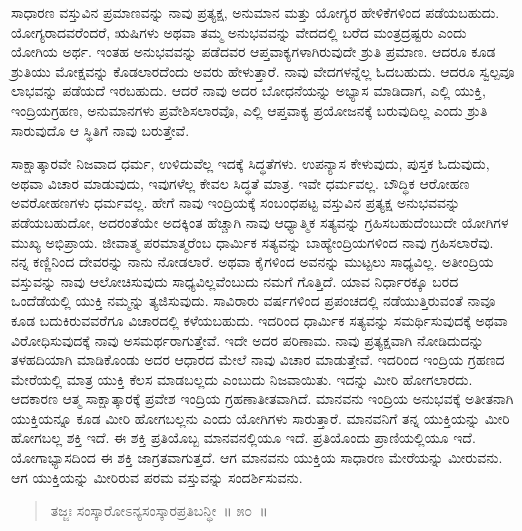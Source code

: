 
\vspace{0.1cm}

ಸಾಧಾರಣ ವಸ್ತುವಿನ ಪ್ರಮಾಣವನ್ನು ನಾವು ಪ್ರತ್ಯಕ್ಷ, ಅನುಮಾನ ಮತ್ತು ಯೋಗ್ಯರ ಹೇಳಿಕೆಗಳಿಂದ ಪಡೆಯಬಹುದು. ಯೋಗ್ಯರಾದವರೆಂದರೆ, ಋಷಿಗಳು ಅಥವಾ ತಮ್ಮ ಅನುಭವವನ್ನು ವೇದದಲ್ಲಿ ಬರೆದ ಮಂತ್ರದ್ರಷ್ಟರು ಎಂದು ಯೋಗಿಯ ಅರ್ಥ. ಇಂತಹ ಅನುಭವವನ್ನು ಪಡೆದವರ ಆಪ್ತವಾಕ್ಯಗಳಾಗಿರುವುದೇ ಶ್ರುತಿ ಪ್ರಮಾಣ. ಆದರೂ ಕೂಡ ಶ್ರುತಿಯು ಮೋಕ್ಷವನ್ನು ಕೊಡಲಾರದೆಂದು ಅವರು ಹೇಳುತ್ತಾರೆ. ನಾವು ವೇದಗಳನ್ನೆಲ್ಲ ಓದಬಹುದು. ಆದರೂ ಸ್ವಲ್ಪವೂ ಲಾಭವನ್ನು ಪಡೆಯದೆ ಇರಬಹುದು. ಆದರೆ ನಾವು ಅದರ ಬೋಧನೆಯನ್ನು ಅಭ್ಯಾಸ ಮಾಡಿದಾಗ, ಎಲ್ಲಿ ಯುಕ್ತಿ, ಇಂದ್ರಿಯಗ್ರಹಣ, ಅನುಮಾನಗಳು ಪ್ರವೇಶಿಸಲಾರವೊ, ಎಲ್ಲಿ ಆಪ್ತವಾಕ್ಯ ಪ್ರಯೋಜನಕ್ಕೆ ಬರುವುದಿಲ್ಲ ಎಂದು ಶ್ರುತಿ ಸಾರುವುದೊ ಆ ಸ್ಥಿತಿಗೆ ನಾವು ಬರುತ್ತೇವೆ. 

ಸಾಕ್ಷಾತ್ಕಾರವೇ ನಿಜವಾದ ಧರ್ಮ, ಉಳಿದುವೆಲ್ಲ ಇದಕ್ಕೆ ಸಿದ್ಧತೆಗಳು. ಉಪನ್ಯಾಸ ಕೇಳುವುದು, ಪುಸ್ತಕ ಓದುವುದು, ಅಥವಾ ವಿಚಾರ ಮಾಡುವುದು, ಇವುಗಳೆಲ್ಲ ಕೇವಲ ಸಿದ್ಧತೆ ಮಾತ್ರ. ಇವೇ ಧರ್ಮವಲ್ಲ. ಬೌದ್ಧಿಕ ಆರೋಹಣ ಅವರೋಹಣಗಳು ಧರ್ಮವಲ್ಲ. ಹೇಗೆ ನಾವು ಇಂದ್ರಿಯಕ್ಕೆ ಸಂಬಂಧಪಟ್ಟ ವಸ್ತುವಿನ ಪ್ರತ್ಯಕ್ಷ ಅನುಭವವನ್ನು ಪಡೆಯಬಹುದೋ, ಅದರಂತೆಯೇ ಅದಕ್ಕಿಂತ ಹೆಚ್ಚಾಗಿ ನಾವು ಆಧ್ಯಾತ್ಮಿಕ ಸತ್ಯವನ್ನು ಗ್ರಹಿಸಬಹುದೆಂಬುದೇ ಯೋಗಿಗಳ ಮುಖ್ಯ ಅಭಿಪ್ರಾಯ. ಜೀವಾತ್ಮ ಪರಮಾತ್ಮರೆಂಬ ಧಾರ್ಮಿಕ ಸತ್ಯವನ್ನು ಬಾಹ್ಯೇಂದ್ರಿಯಗಳಿಂದ ನಾವು ಗ್ರಹಿಸಲಾರೆವು. ನನ್ನ ಕಣ್ಣಿನಿಂದ ದೇವರನ್ನು ನಾನು ನೋಡಲಾರೆ. ಅಥವಾ ಕೈಗಳಿಂದ ಅವನನ್ನು ಮುಟ್ಟಲು ಸಾಧ್ಯವಿಲ್ಲ. ಅತೀಂದ್ರಿಯ ವಸ್ತುವನ್ನು ನಾವು ಆಲೋಚಿಸುವುದು ಸಾಧ್ಯವಿಲ್ಲವೆಂಬುದು ನಮಗೆ ಗೊತ್ತಿದೆ. ಯಾವ ನಿರ್ಧಾರಕ್ಕೂ ಬರದ ಒಂದೆಡೆಯಲ್ಲಿ ಯುಕ್ತಿ ನಮ್ಮನ್ನು ತ್ಯಜಿಸುವುದು. ಸಾವಿರಾರು ವರ್ಷಗಳಿಂದ ಪ್ರಪಂಚದಲ್ಲಿ ನಡೆಯುತ್ತಿರುವಂತೆ ನಾವೂ ಕೂಡ ಬದುಕಿರುವವರೆಗೂ ವಿಚಾರದಲ್ಲಿ ಕಳೆಯಬಹುದು. ಇದರಿಂದ ಧಾರ್ಮಿಕ ಸತ್ಯವನ್ನು ಸಮರ್ಥಿಸುವುದಕ್ಕೆ ಅಥವಾ ವಿರೋಧಿಸುವುದಕ್ಕೆ ನಾವು ಅಸಮರ್ಥರಾಗುತ್ತೇವೆ. ಇದೇ ಅದರ ಪರಿಣಾಮ. ನಾವು ಪ್ರತ್ಯಕ್ಷವಾಗಿ ನೋಡಿದುದನ್ನು ತಳಹದಿಯಾಗಿ ಮಾಡಿಕೊಂಡು ಅದರ ಆಧಾರದ ಮೇಲೆ ನಾವು ವಿಚಾರ ಮಾಡುತ್ತೇವೆ. ಇದರಿಂದ ಇಂದ್ರಿಯ ಗ್ರಹಣದ ಮೇರೆಯಲ್ಲಿ ಮಾತ್ರ ಯುಕ್ತಿ ಕೆಲಸ ಮಾಡಬಲ್ಲದು ಎಂಬುದು ನಿಜವಾಯಿತು. ಇದನ್ನು ಮೀರಿ ಹೋಗಲಾರದು. ಆದಕಾರಣ ಆತ್ಮ ಸಾಕ್ಷಾತ್ಕಾರಕ್ಕೆ ಪ್ರವೇಶ ಇಂದ್ರಿಯ ಗ್ರಹಣಾತೀತವಾಗಿದೆ. ಮಾನವನು ಇಂದ್ರಿಯ ಅನುಭವಕ್ಕೆ ಅತೀತನಾಗಿ ಯುಕ್ತಿಯನ್ನೂ ಕೂಡ ಮೀರಿ ಹೋಗಬಲ್ಲನು ಎಂದು ಯೋಗಿಗಳು ಸಾರುತ್ತಾರೆ. ಮಾನವನಿಗೆ ತನ್ನ ಯುಕ್ತಿಯನ್ನು ಮೀರಿ ಹೋಗಬಲ್ಲ ಶಕ್ತಿ ಇದೆ. ಈ ಶಕ್ತಿ ಪ್ರತಿಯೊಬ್ಬ ಮಾನವನಲ್ಲಿಯೂ ಇದೆ. ಪ್ರತಿಯೊಂದು ಪ್ರಾಣಿಯಲ್ಲಿಯೂ ಇದೆ. ಯೋಗಾಭ್ಯಾಸದಿಂದ ಈ ಶಕ್ತಿ ಜಾಗ್ರತವಾಗುತ್ತದೆ. ಆಗ ಮಾನವನು ಯುಕ್ತಿಯ ಸಾಧಾರಣ ಮೇರೆಯನ್ನು ಮೀರುವನು. ಆಗ ಯುಕ್ತಿಯನ್ನು ಮೀರಿರುವ ಪರಮ ವಸ್ತುವನ್ನು ಸಂದರ್ಶಿಸುವನು. 

\vspace{-0.4cm}

\begin{verse}
ತಜ್ಜಃ ಸಂಸ್ಕಾರೋಽನ್ಯಸಂಸ್ಕಾರಪ್ರತಿಬನ್ಧೀ~॥ ೫೦~॥
\end{verse}

